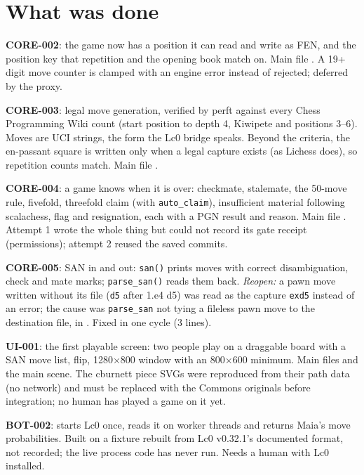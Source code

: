 \documentclass[11pt,a4paper]{article}
\begin{document}
\section*{What was done}

\textbf{CORE-002}: the game now has a position it can read and write as FEN, and the
position key that repetition and the opening book match on. Main file
. A 19+ digit move counter is clamped with an engine error instead of
rejected; deferred by the proxy.

\textbf{CORE-003}: legal move generation, verified by perft against every Chess Programming
Wiki count (start position to depth 4, Kiwipete and positions 3--6). Moves are UCI strings,
the form the Lc0 bridge speaks. Beyond the criteria, the en-passant square is written only
when a legal capture exists (as Lichess does), so repetition counts match. Main file
.

\textbf{CORE-004}: a game knows when it is over: checkmate, stalemate, the 50-move rule,
fivefold, threefold claim (with \texttt{auto\_claim}), insufficient material following
scalachess, flag and resignation, each with a PGN result and reason. Main file
. Attempt 1 wrote the whole thing but could not record its gate receipt
(permissions); attempt 2 reused the saved commits.

\textbf{CORE-005}: SAN in and out: \texttt{san()} prints moves with correct disambiguation,
check and mate marks; \texttt{parse\_san()} reads them back. \emph{Reopen:} a pawn move
written without its file (\texttt{d5} after 1.e4 d5) was read as the capture
\texttt{exd5} instead of an error; the cause was \texttt{parse\_san} not tying a fileless pawn
move to the destination file, in . Fixed in one cycle (3 lines).

\textbf{UI-001}: the first playable screen: two people play on a draggable board with a SAN
move list, flip, 1280$\times$800 window with an 800$\times$600 minimum. Main files
 and the main scene. The cburnett piece SVGs were reproduced from
their path data (no network) and must be replaced with the Commons originals before
integration; no human has played a game on it yet.

\textbf{BOT-002}:  starts Lc0 once, reads it on worker threads and returns
Maia's move probabilities. Built on a fixture rebuilt from Lc0 v0.32.1's documented format,
not recorded; the live process code has never run. Needs a human with Lc0 installed.
\end{document}

